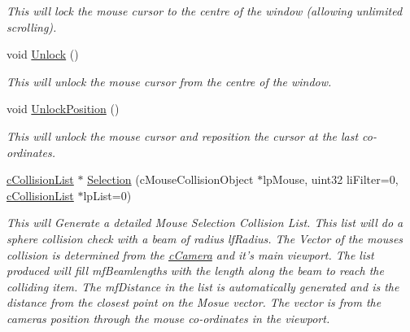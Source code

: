 \begin{DoxyCompactItemize}
\begin{DoxyCompactList}\small\item\em This will lock the mouse cursor to the centre of the window (allowing unlimited scrolling). \end{DoxyCompactList}\item 
\hypertarget{classc_mouse_a869bb420067947a30b57ad649e3f1f14}{
void \hyperlink{classc_mouse_a869bb420067947a30b57ad649e3f1f14}{Unlock} ()}
\label{classc_mouse_a869bb420067947a30b57ad649e3f1f14}

\begin{DoxyCompactList}\small\item\em This will unlock the mouse cursor from the centre of the window. \end{DoxyCompactList}\item 
\hypertarget{classc_mouse_a606b78beca6e7daee0a2142cdb26f9d6}{
void \hyperlink{classc_mouse_a606b78beca6e7daee0a2142cdb26f9d6}{UnlockPosition} ()}
\label{classc_mouse_a606b78beca6e7daee0a2142cdb26f9d6}

\begin{DoxyCompactList}\small\item\em This will unlock the mouse cursor and reposition the cursor at the last co-\/ordinates. \end{DoxyCompactList}\item 
\hypertarget{classc_mouse_a237297c2d9c3f12df280ab957571fa18}{
\hyperlink{classc_collision_list}{cCollisionList} $\ast$ \hyperlink{classc_mouse_a237297c2d9c3f12df280ab957571fa18}{Selection} (cMouseCollisionObject $\ast$lpMouse, uint32 liFilter=0, \hyperlink{classc_collision_list}{cCollisionList} $\ast$lpList=0)}
\label{classc_mouse_a237297c2d9c3f12df280ab957571fa18}

\begin{DoxyCompactList}\small\item\em This will Generate a detailed Mouse Selection Collision List. This list will do a sphere collision check with a beam of radius lfRadius. The Vector of the mouses collision is determined from the \hyperlink{classc_camera}{cCamera} and it's main viewport. The list produced will fill mfBeamlengths with the length along the beam to reach the colliding item. The mfDistance in the list is automatically generated and is the distance from the closest point on the Mosue vector. The vector is from the cameras position through the mouse co-\/ordinates in the viewport. \end{DoxyCompactList}\end{DoxyCompactItemize}
